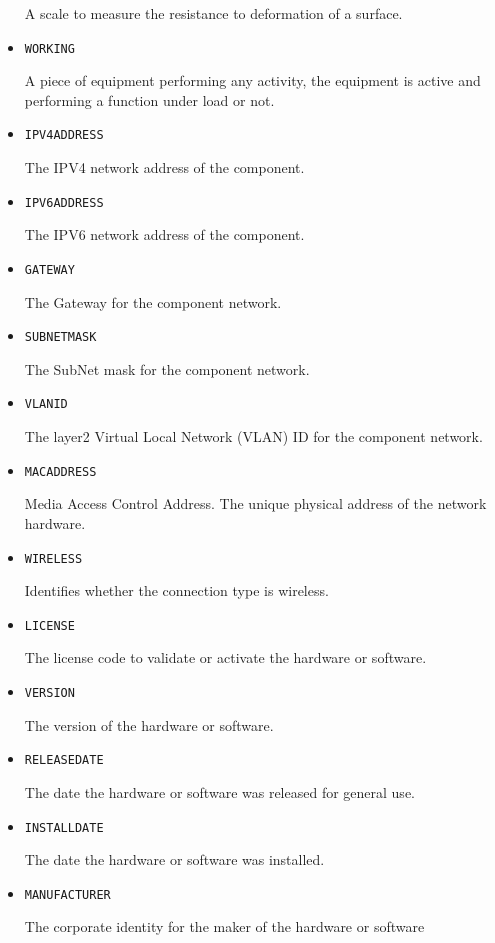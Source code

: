 \begin{itemize}
A scale to measure the resistance to deformation of a surface.


\item \texttt{WORKING}  

A piece of equipment performing any activity, the equipment is active and performing a function under load or not.


\item \texttt{IPV4\textunderscore ADDRESS}  

The IPV4 network address of the component.


\item \texttt{IPV6\textunderscore ADDRESS}  

The IPV6 network address of the component.


\item \texttt{GATEWAY}  

The Gateway for the component network.


\item \texttt{SUBNET\textunderscore MASK}  

The SubNet mask for the component network.



\item \texttt{VLAN\textunderscore ID}  

The layer2 Virtual Local Network (VLAN) ID for the component network.


\item \texttt{MAC\textunderscore ADDRESS}  

Media Access Control Address. The unique physical address of the network hardware.


\item \texttt{WIRELESS}  

Identifies whether the connection type is wireless.


\item \texttt{LICENSE}  

The license code to validate or activate the hardware or software.


\item \texttt{VERSION}  

The version of the hardware or software.



\item \texttt{RELEASE\textunderscore DATE}  

The date the hardware or software was released for general use.


\item \texttt{INSTALL\textunderscore DATE}  

The date the hardware or software was installed.


\item \texttt{MANUFACTURER}  

The corporate identity for the maker of the hardware or software

\end{itemize}

